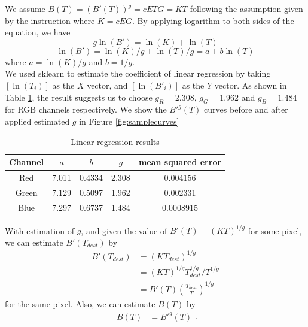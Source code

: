 \documentclass[10pt,twocolumn,letterpaper]{article}
\begin{document}
We assume $B(T) = (B'(T))^g = cETG = KT  $ following the assumption given by the instruction where $K = cEG$. By applying logarithm to both sides of the equation, we have 
$$ g\ln(B') = \ln(K) + \ln(T) $$
$$ \ln(B') = \ln(K)/g + \ln(T)/g = a + b\ln(T) $$ where $a = \ln(K)/g$ and $b=1/g$. \\

We used sklearn to estimate the coefficient of linear regression by taking $[\ln(T_i)]$ as the $X$ vector, and $[\ln(B'_i)]$ as the $Y$ vector. As shown in Table \ref{tab:linear}, the result suggests us to choose $g_R = 2.308$, $g_G = 1.962$ and $g_B = 1.484$ for RGB channels respectively. We show the $B'^g(T)$ curves before and after applied estimated $g$ in Figure \ref{fig:samplecurves}\\


\begin{table}[]
\caption{Linear regression results}
\centering
\begin{tabular}{|c|c|c|c|c|}
\hline
Channel &  $a$  &  $b$ & $g$ & mean squared error  \\
\hline

Red & 7.011 & 0.4334 & 2.308 & 0.004156 \\
\hline
Green & 7.129& 0.5097 & 1.962 & 0.002331\\
\hline
Blue & 7.297 & 0.6737 & 1.484 & 0.0008915\\
\hline

 \hline

\end{tabular}
\label{tab:linear}
\end{table}


With estimation of $g$, and given the value of $B'(T) = (KT)^{1/g}$ for some pixel, we can estimate $B'(T_{dest})$ by 
\begin{equation}
\begin{aligned}
B'(T_{dest})     &=  (KT_{dest})^{1/g}\\
            &=  (KT)^{1/g}T_{dest}^{1/g}/T^{1/g}\\
            &=  B'(T) (\frac{T_{dest}}{T})^{1/g}
\end{aligned}
\label{equ:nonlinear}
\end{equation}
for the same pixel. Also, we can estimate $B(T)$ by
\begin{equation}
\begin{aligned}
B(T)     &=  B'^g(T)
\end{aligned}.
\label{equ:linear}
\end{equation}
\end{document}
